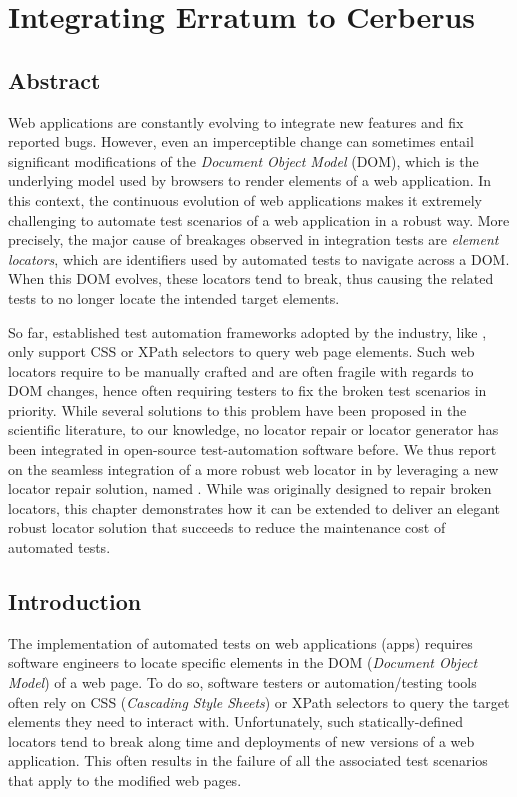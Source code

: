 \chapter{Integrating Erratum to Cerberus}\label{chap:cerberus}

\section{Abstract}
Web applications are constantly evolving to integrate new features and fix reported bugs.
However, even an imperceptible change can sometimes entail significant modifications of the \emph{Document Object Model} (DOM), which is the underlying model used by browsers to render elements of a web application.
In this context, the continuous evolution of web applications makes it extremely challenging to automate test scenarios of a web application in a robust way.
More precisely, the major cause of breakages observed in integration tests are \emph{element locators}, which are identifiers used by automated tests to navigate across a DOM.
When this DOM evolves, these locators tend to break, thus causing the related tests to no longer locate the intended target elements.

So far, established test automation frameworks adopted by the industry, like \cerberus{}, only support CSS or XPath selectors to query web page elements.
Such web locators require to be manually crafted and are often fragile with regards to DOM changes, hence often requiring testers to fix the broken test scenarios in priority. 
While several solutions to this problem have been proposed in the scientific literature, to our knowledge, no locator repair or locator generator has been integrated in open-source test-automation software before.
We thus report on the seamless integration of a more robust web locator in \cerberus{} by leveraging a new locator repair solution, named \erratum{}. While \erratum was originally designed to repair broken locators, this chapter demonstrates how it can be extended to deliver an elegant robust locator solution that succeeds to reduce the maintenance cost of automated tests.

\section{Introduction}
The implementation of automated tests on web applications (apps) requires software engineers to locate specific elements in the DOM (\emph{Document Object Model}) of a web page.
To do so, software testers or automation/testing tools often rely on CSS (\emph{Cascading Style Sheets}) or XPath selectors to query the target elements they need to interact with.
Unfortunately, such statically-defined locators tend to break along time and deployments of new versions of a web application.
This often results in the failure of all the associated test scenarios that apply to the modified web pages.

